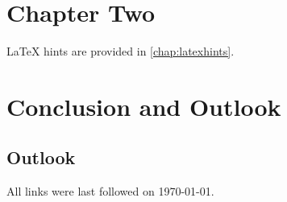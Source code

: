 \documentclass[
a4paper,
twoside,
bibliography=totoc,
headsepline,
cleardoublepage=empty,
parskip=half,
draft=false
]{scrbook}
\begin{document}
	\chapter{Chapter Two}
	\label{chap:k2}
	
	LaTeX hints are provided in \cref{chap:latexhints}.
	
	\blinddocument
	
	
	\chapter{Conclusion and Outlook}
	\label{chap:zusfas}
	
	\section*{Outlook}
	
	\appendix
	
	
	\clearpage
	
	
	\printbibliography
	
	All links were last followed on \today.
	
	\pagestyle{empty}
	\renewcommand*{\chapterpagestyle}{empty}
	\Versicherung
\end{document}
